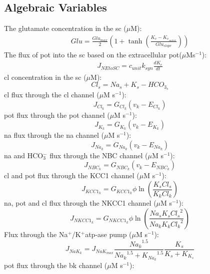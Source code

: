 \documentclass[11pt]{elsarticle}
\newcommand{\sodpot}{Na$^+$/K$^+$\xspace}
\newcommand{\hco}{HCO$_3^-$\xspace}
\newcommand{\mus}{$\mu$M s$^{-1}$\xspace}
\newcommand{\uM}{$\mu$M\xspace}
\newcommand{\na}{\gls{na}\xspace}
\newcommand{\pot}{\gls{pot}\xspace}
\newcommand{\cl}{\gls{cl}\xspace}
\begin{document}
			\subsection{Algebraic Variables}
The glutamate concentration in the \gls{sc} (\uM):
\begin{align}
Glu = \frac{Glu_{max}}{2} \left( 1 + \tanh \left( \frac{K_e - K_{e_{switch}}}{Glu_{slope}}  \right)  \right)
\end{align}
%				
The flux of \pot into the \gls{sc} based on the extracellular \pot ($\mu$Ms$^{-1}$):
\begin{align}
J_{NEtoSC} = c_{unit} k_{syn}  \frac{d K_e}{dt}   
\end{align}
%
\cl concentration in the \gls{sc} (\uM): 
\begin{equation} \label{eq:ClEx}
Cl_s = Na_s + K_s - HCO_{3_s}
\end{equation}
%
\cl flux through the \cl channel (\mus): 
\begin{equation} \label{eq:J_Cl}
J_{Cl_k}=G_{Cl_{k}}(v_k - E_{Cl_k})
\end{equation}
%
\pot flux through the \pot channel (\mus): 
\begin{equation} \label{eq:J_K}
J_{K_k}=G_{K_{k}}(v_k - E_{K_k})
\end{equation}
%
\na flux through the \na channel (\mus):
\begin{equation} \label{eq:J_Na}
J_{Na_k}=G_{Na_{k}}(v_k - E_{Na_k})
\end{equation}
%
\na and \hco flux through the NBC channel (\mus): 
\begin{equation} \label{eq:J_NBC}
J_{NBC_k}=G_{NBC_k}\left(  v_k -E_{NBC_k}  \right)
\end{equation}
%
\cl and \pot flux through the KCC1 channel (\mus): 
\begin{equation} \label{eq:J_KCC1}
J_{KCC1_k}=G_{KCC1_k} \phi \ln \left(\frac{K_s Cl_s }{K_k Cl_k}\right)
\end{equation}
%
\na, \pot and \cl flux through the NKCC1 channel (\mus): 
\begin{equation} \label{eq:J_NKCC1}
J_{NKCC1_k}=G_{NKCC1_k} \phi \ln \left(\frac{Na_s K_s {Cl_s}^2}{Na_k K_k {Cl_k}^2}\right)
\end{equation}
%
Flux through the \sodpot \gls{atp}-ase pump (\mus): 
\begin{equation} \label{eq:J_NaK_s}
J_{NaK_{k}}=J_{NaK_{max}}\frac{{Na_k}^{1.5}}{{Na_k}^{1.5}+{K_{Na_k}}^{1.5}}\frac{K_s}{K_s+K_{K_s}}
\end{equation}
%
\pot flux through the \gls{bk} channel (\mus): 
\end{document}
